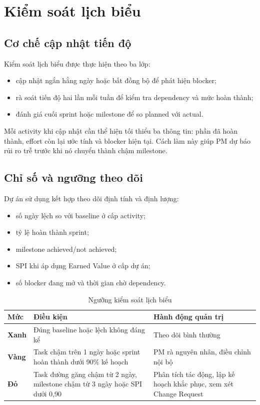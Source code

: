 \section{Kiểm soát lịch biểu}

\subsection{Cơ chế cập nhật tiến độ}

Kiểm soát lịch biểu được thực hiện theo ba lớp:

\begin{itemize}
  \item cập nhật ngắn hằng ngày hoặc bất đồng bộ để phát hiện blocker;
  \item rà soát tiến độ hai lần mỗi tuần để kiểm tra dependency và mức hoàn thành;
  \item đánh giá cuối sprint hoặc milestone để so planned với actual.
\end{itemize}

Mỗi activity khi cập nhật cần thể hiện tối thiểu ba thông tin: phần đã hoàn thành, effort còn lại ước tính và blocker hiện tại. Cách làm này giúp PM dự báo rủi ro trễ trước khi nó chuyển thành chậm milestone.

\subsection{Chỉ số và ngưỡng theo dõi}

Dự án sử dụng kết hợp theo dõi định tính và định lượng:

\begin{itemize}
  \item số ngày lệch so với baseline ở cấp activity;
  \item tỷ lệ hoàn thành sprint;
  \item milestone achieved/not achieved;
  \item SPI khi áp dụng Earned Value ở cấp dự án;
  \item số blocker đang mở và thời gian chờ dependency.
\end{itemize}

\begin{table}[H]
\centering
\caption{Ngưỡng kiểm soát lịch biểu}
\label{tab:schedule-thresholds}
\begin{tabularx}{\textwidth}{| >{\bfseries}p{2.8cm} | p{4.4cm} | X |}
\hline
Mức & Điều kiện & Hành động quản trị \\
\hline
Xanh & Đúng baseline hoặc lệch không đáng kể & Theo dõi bình thường \\ \hline
Vàng & Task chậm trên 1 ngày hoặc sprint hoàn thành dưới 90\% kế hoạch & PM rà nguyên nhân, điều chỉnh nội bộ \\ \hline
Đỏ & Task đường găng chậm từ 2 ngày, milestone chậm từ 3 ngày hoặc SPI dưới 0,90 & Phân tích tác động, lập kế hoạch khắc phục, xem xét Change Request \\
\hline
\end{tabularx}
\end{table}

